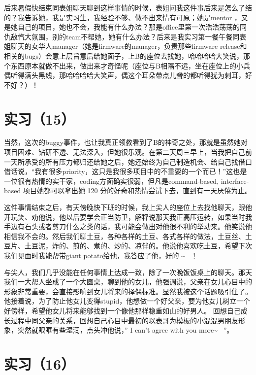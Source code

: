 \documentclass[12pt]{book}
\begin{document}
后来暑假快结束同表姐聊天聊到这样事情的时候，表姐问我这件事后来是怎么了结的？我告诉她，我是实习生，我经验不够、做不出来情有可原；她是mentor ，又是她自己的项目，她也不会，我能有什么办法？那是office里第一次浩浩荡荡的同仇敌忾大氛围，别的team不帮她，她有什么办法？后来是我实习第一餐午餐同表姐聊天的女华人manager（她是firmware的manager，负责那些firmware release和相关的bugs）会意上层旨意后给她面子，上B的座位去找她，哈哈哈哈大笑说，那个东西原本就做不出来，做出来才奇怪呢（座位与B相隔不远，坐在座位上的小兵偶听得满头黑线，那哈哈哈哈大笑声，偶这个耳朵带点儿聋的都听得犹为刺耳，好不好？）！

\section{实习（15）}
\label{sec-5-18}

当然，这次的buggy事件，也让我真正领教看到了B的神奇之处，那就是虽然她对项目困难、钻研不透、无法深入，但她很乐观。在第二天周三早上，当我把自己前一天所承受的所有压力都归还给她之后，她还始终为自己制造机会、给自己找借口借话说，“我有很多priority，这只是我很多项目中的不重要的一个而已！”这也是一位很有热情的实干家，coding方面确实很弱，但凡是command-based, interface-based 项目她都可以拿出她 120 分的好奇和热情尝试下去，直到有一天厌倦为止。

这件事情结束之后，有天傍晚快下班的时候，我上尖人的座位上去找他聊天，跟他开玩笑、劝他说，他以后要学会正当防卫，解释说那天我正高压运转，如果当时我手边有石头或者剪刀什么之类的话，我可能会做出对他很不利的举动来。他笑说他相信我不会的。然后我们聊土豆，各种各样的土豆、各式各样的做法，土豆丝、土豆片、土豆泥，炸的、煎的、煮的、炒的、凉伴的。他说他喜欢吃土豆，希望下次我们见面时我能帮带giant potato给他，我答应了他，好的 \textasciitilde{}~ ！

与尖人，我们几乎没能在任何事情上达成一致，除了一次晚饭饭桌上的聊天。那天我们一大帮人坐成了一个大圆桌，聊到他的女儿，他强调说，父亲在女儿心目中的形象非常重要，会直接影响到女儿将来的择偶标准。显然我被这个话题吸引住了。他接着说，为了防止他女儿变得stupid，他想做一个好父亲，要为他女儿树立一个好傍样，希望他女儿将来能够找到一个像他那样稳重如山的好男人。 回想自己成长过程中同父亲的关系，回想自己心目中最初的以表哥为模板的小混混男朋友形象，突然就眼眶有些湿润，点头冲他说，”  I can’t agree with you more\textasciitilde{}~  ”。

\section{实习（16）}
\label{sec-5-19}
\end{document}
